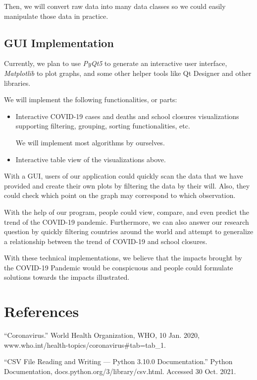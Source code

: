 \documentclass[fontsize=11pt]{article}
\begin{document}
Then, we will convert raw data into many data classes so we could easily manipulate those data in practice.

\subsection*{GUI Implementation}

Currently, we plan to use \emph{PyQt5} to generate an interactive user interface, \emph{Matplotlib} to plot graphs, and some other helper tools like Qt Designer and other libraries.

We will implement the following functionalities, or parts:

\begin{itemize}
    \item
        Interactive COVID-19 cases and deaths and school closures visualizations supporting filtering, grouping, sorting functionalities, etc.

        We will implement most algorithms by ourselves.
    \item
        Interactive table view of the visualizations above.
\end{itemize}

With a GUI, users of our application could quickly scan the data that we have provided and create their own plots by filtering the data by their will. Also, they could check which point on the graph may correspond to which observation.

With the help of our program, people could view, compare, and even predict the trend of the COVID-19 pandemic. Furthermore, we can also answer our research question by quickly filtering countries around the world and attempt to generalize a relationship between the trend of COVID-19 and school closures.

With these technical implementations, we believe that the impacts brought by the COVID-19 Pandemic would be conspicuous and people could formulate solutions towards the impacts illustrated.

\newpage

\section*{References}

“Coronavirus.” World Health Organization, WHO, 10 Jan. 2020, www.who.int/health-topics/coronavirus\#tab=tab\_1.

“CSV File Reading and Writing — Python 3.10.0 Documentation.” Python Documentation, docs.python.org/3/library/csv.html. Accessed 30 Oct. 2021.
\end{document}
